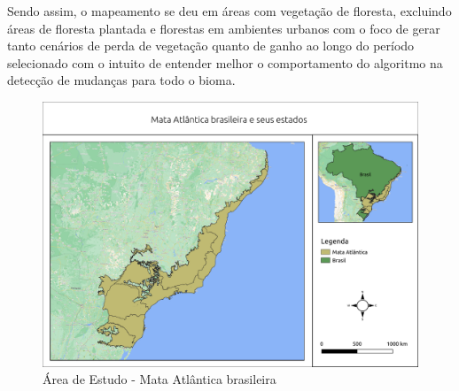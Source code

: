 Sendo assim, o mapeamento se deu em áreas com vegetação de floresta, excluindo áreas de floresta plantada e florestas em ambientes urbanos com o foco de gerar tanto cenários de perda de vegetação quanto de ganho ao longo do período selecionado com o intuito de entender melhor o comportamento do algoritmo na detecção de mudanças para todo o bioma. 

\begin{figure}[h!]
    \centering
    \includegraphics[scale=.5]{images/mata_atlantica.png}
    \caption{Área de Estudo - Mata Atlântica brasileira}
    \label{fig:mata_atlantica}
\end{figure}

\newpage

